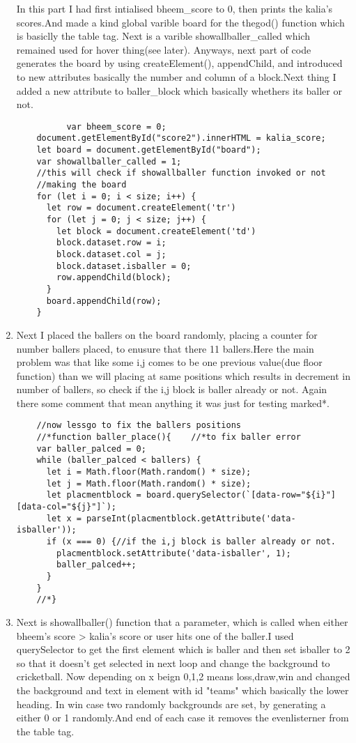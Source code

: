 \documentclass{article}
\begin{document}
\begin{flushleft}
\begin{enumerate}
    In this part I had first intialised bheem\_score to 0, then prints the kalia's scores.And made a kind global varible board for the thegod() function which is basiclly the table tag. Next is a varible showallballer\_called which remained used for hover thing(see later). Anyways, next part of code generates the board by using createElement(), appendChild, and introduced to new attributes basically the number and column of a block.Next thing I added a new attribute to baller\_block which basically whethers its baller or not. 
    \begin{verbatim}
          var bheem_score = 0;
    document.getElementById("score2").innerHTML = kalia_score;
    let board = document.getElementById("board");
    var showallballer_called = 1; 
    //this will check if showallballer function invoked or not
    //making the board
    for (let i = 0; i < size; i++) {
      let row = document.createElement('tr')
      for (let j = 0; j < size; j++) {
        let block = document.createElement('td')
        block.dataset.row = i;
        block.dataset.col = j;
        block.dataset.isballer = 0;
        row.appendChild(block);
      }
      board.appendChild(row);
    }
    \end{verbatim}
    \item 
    Next I placed the ballers on the board randomly, placing a counter for number ballers placed, to enusure that there 11 ballers.Here the main problem was that like some i,j comes to be one previous value(due floor function) than we will placing at same positions which results in decrement in number of ballers, so check if the i,j block is baller already or not. Again there some comment that mean anything it was just for testing marked*.
    \begin{verbatim}
    //now lessgo to fix the ballers positions
    //*function baller_place(){    //*to fix baller error
    var baller_palced = 0;
    while (baller_palced < ballers) {
      let i = Math.floor(Math.random() * size);
      let j = Math.floor(Math.random() * size);
      let placmentblock = board.querySelector(`[data-row="${i}"][data-col="${j}"]`);
      let x = parseInt(placmentblock.getAttribute('data-isballer'));
      if (x === 0) {//if the i,j block is baller already or not.
        placmentblock.setAttribute('data-isballer', 1);
        baller_palced++;
      }
    }
    //*}
    \end{verbatim}
    \item 
    Next is showallballer() function that a parameter, which is called when either bheem's score > kalia's score or user hits one of the baller.I used querySelector to get the first element which is baller and then set isballer to 2 so that it doesn't get selected in next loop and change the background to cricketball. Now depending on x beign 0,1,2 means loss,draw,win and changed the background and text in element with id "teams" which basically the lower heading. In win case two randomly backgrounds are set, by generating a either 0 or 1 randomly.And end of each case it removes the evenlisterner from the table tag.

\end{enumerate}
\end{flushleft}
\end{document}

